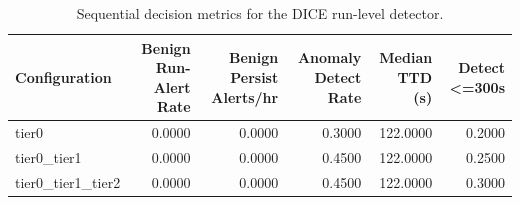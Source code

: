 \begin{table}[t]
\centering
\caption{Sequential decision metrics for the DICE run-level detector.}
\label{tab:dice_sequential_metrics}
\footnotesize
\begin{tabular}{lrrrrr}
\toprule
Configuration & Benign Run-Alert Rate & Benign Persist Alerts/hr & Anomaly Detect Rate & Median TTD (s) & Detect <=300s \\
\midrule
tier0 & 0.0000 & 0.0000 & 0.3000 & 122.0000 & 0.2000 \\
tier0_tier1 & 0.0000 & 0.0000 & 0.4500 & 122.0000 & 0.2500 \\
tier0_tier1_tier2 & 0.0000 & 0.0000 & 0.4500 & 122.0000 & 0.3000 \\
\bottomrule
\end{tabular}

\end{table}
